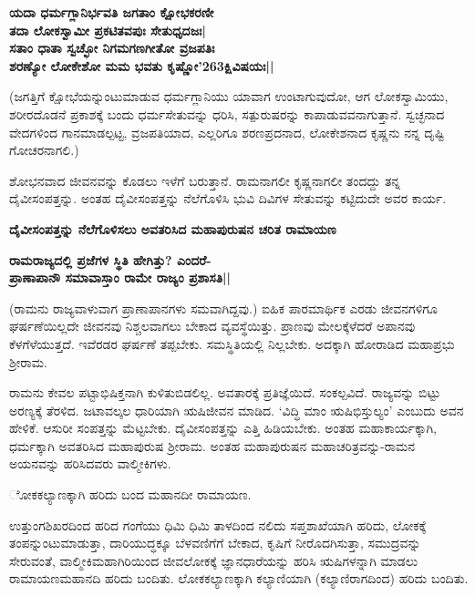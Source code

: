\begin{center} 

{\bf ಯದಾ ಧರ್ಮಗ್ಲಾನಿರ್ಭವತಿ ಜಗತಾಂ ಕ್ಷೋಭಕರಣೀ\\ 

ತದಾ ಲೋಕಸ್ವಾಮೀ ಪ್ರಕಟಿತವಪುಃ ಸೇತುಧೃದಜಃ|\\ 

ಸತಾಂ ಧಾತಾ ಸ್ವಚ್ಛೋ ನಿಗಮಗಣಗೀತೋ ವ್ರಜಪತಿಃ\\ 

ಶರಣ್ಯೋ ಲೋಕೇಶೋ ಮಮ ಭವತು ಕೃಷ್ಣೋ\char'263ಕ್ಷಿವಿಷಯಃ||} 

\end{center} 


(ಜಗತ್ತಿಗೆ ಕ್ಷೋಭೆಯನ್ನುಂಟುಮಾಡುವ ಧರ್ಮಗ್ಲಾನಿಯು ಯಾವಾಗ ಉಂಟಾಗುವುದೋ, ಆಗ ಲೋಕಸ್ವಾಮಿಯು, ಶರೀರದೊಡನೆ ಪ್ರಕಾಶಕ್ಕೆ ಬಂದು ಧರ್ಮಸೇತುವನ್ನು ಧರಿಸಿ, ಸತ್ಪುರುಷರನ್ನು ಕಾಪಾಡುವವನಾಗುತ್ತಾನೆ. ಸ್ವಚ್ಛನಾದ ವೇದಗಳಿಂದ ಗಾನಮಾಡಲ್ಪಟ್ಟ, ವ್ರಜಪತಿಯಾದ, ಎಲ್ಲರಿಗೂ ಶರಣಪ್ರದನಾದ, ಲೋಕೇಶನಾದ ಕೃಷ್ಣನು ನನ್ನ ದೃಷ್ಟಿ ಗೋಚರನಾಗಲಿ.) 


ಶೋಭನವಾದ ಜೀವನವನ್ನು ಕೊಡಲು ಇಳೆಗೆ ಬರುತ್ತಾನೆ. ರಾಮನಾಗಲೀ ಕೃಷ್ಣನಾಗಲೀ ತಂದದ್ದು ತನ್ನ ದೈವೀಸಂಪತ್ತನ್ನು. ಅಂತಹ ದೈವೀಸಂಪತ್ತನ್ನು ನೆಲೆಗೊಳಿಸಿ ಭುವಿ ದಿವಿಗಳ ಸೇತುವನ್ನು ಕಟ್ಟಿದುದೇ ಅವರ ಕಾರ್ಯ. 


{\bf ದೈವೀಸಂಪತ್ತನ್ನು ನೆಲೆಗೊಳಿಸಲು ಅವತರಿಸಿದ ಮಹಾಪುರುಷನ ಚರಿತ ರಾಮಾಯಣ} 


\begin{center} 

{\bf ರಾಮರಾಜ್ಯದಲ್ಲಿ ಪ್ರಜೆಗಳ ಸ್ಥಿತಿ ಹೇಗಿತ್ತು? ಎಂದರೆ-\\ 

ಪ್ರಾಣಾಪಾನೌ ಸಮಾವಾಸ್ತಾಂ ರಾಮೇ ರಾಜ್ಯಂ ಪ್ರಶಾಸತಿ||} 

\end{center} 


(ರಾಮನು ರಾಜ್ಯವಾಳುವಾಗ ಪ್ರಾಣಾಪಾನಗಳು ಸಮವಾಗಿದ್ದವು.) ಐಹಿಕ ಪಾರಮಾರ್ಥಿಕ ಎರಡು ಜೀವನಗಳಿಗೂ ಘರ್ಷಣೆಯಿಲ್ಲದೇ ಜೀವನವು ನಿಶ್ಚಲವಾಗಲು ಬೇಕಾದ ವ್ಯವಸ್ಥೆಯಿತ್ತು. ಪ್ರಾಣವು ಮೇಲಕ್ಕೆಳೆದರೆ ಅಪಾನವು ಕೆಳಗೆಳೆಯುತ್ತದೆ. ಇವೆರಡರ ಘರ್ಷಣೆ ತಪ್ಪಬೇಕು. ಸಮಸ್ಥಿತಿಯಲ್ಲಿ ನಿಲ್ಲಬೇಕು. ಅದಕ್ಕಾಗಿ ಹೋರಾಡಿದ ಮಹಾಪ್ರಭು ಶ್ರೀರಾಮ. 


ರಾಮನು ಕೇವಲ ಪಟ್ಟಾಭಿಷಿಕ್ತನಾಗಿ ಕುಳಿತುಬಿಡಲಿಲ್ಲ. ಅವತಾರಕ್ಕೆ ಪ್ರತಿಜ್ಞೆಯಿದೆ. ಸಂಕಲ್ಪವಿದೆ. ರಾಜ್ಯವನ್ನು ಬಿಟ್ಟು ಅರಣ್ಯಕ್ಕೆ ತೆರಳಿದ. ಜಟಾವಲ್ಕಲ ಧಾರಿಯಾಗಿ ಋಷಿಜೀವನ ಮಾಡಿದ. `ವಿದ್ಧಿ ಮಾಂ ಋಷಿಭಿಸ್ತುಲ್ಯಂ' ಎಂಬುದು ಅವನ ಹೇಳಿಕೆ. ಆಸುರೀ ಸಂಪತ್ತನ್ನು ಮೆಟ್ಟಬೇಕು. ದೈವೀಸಂಪತ್ತನ್ನು ಎತ್ತಿ ಹಿಡಿಯಬೇಕು. ಅಂತಹ ಮಹಾಕಾರ್ಯಕ್ಕಾಗಿ, ಧರ್ಮಕ್ಕಾಗಿ ಅವತರಿಸಿದ ಮಹಾಪುರುಷ ಶ್ರೀರಾಮ. ಅಂತಹ ಮಹಾಪುರುಷನ ಮಹಾಚರಿತ್ರವನ್ನು-ರಾಮನ ಅಯನವನ್ನು ಹರಿಸಿದವರು ವಾಲ್ಮೀಕಿಗಳು. 


\large{ೋಕಕಲ್ಯಾಣಕ್ಕಾಗಿ ಹರಿದು ಬಂದ ಮಹಾನದೀ ರಾಮಾಯಣ.} 


ಉತ್ತುಂಗಶಿಖರದಿಂದ ಹರಿದ ಗಂಗೆಯು ಧಿಮಿ ಧಿಮಿ ತಾಳದಿಂದ ನಲಿದು ಸಪ್ತಶಾಖೆಯಾಗಿ ಹರಿದು, ಲೋಕಕ್ಕೆ ತಂಪನ್ನುಂಟುಮಾಡುತ್ತಾ, ದಾರಿಯುದ್ಧಕ್ಕೂ ಬೆಳವಣಿಗೆಗೆ ಬೇಕಾದ, ಕೃಷಿಗೆ ನೀರೊದಗಿಸುತ್ತಾ, ಸಮುದ್ರವನ್ನು ಸೇರುವಂತೆ, ವಾಲ್ಮೀಕಿಮಹಾಗಿರಿಯಿಂದ ಜೀವಲೋಕಕ್ಕೆ ಜ್ಞಾನಧಾರೆಯನ್ನು ಹರಿಸಿ ಋಷಿಗಳನ್ನಾಗಿ ಮಾಡಲು ರಾಮಾಯಣಮಹಾನದಿ ಹರಿದು ಬಂದಿತು. ಲೋಕಕಲ್ಯಾಣಕ್ಕಾಗಿ ಕಲ್ಯಾಣಿಯಾಗಿ (ಕಲ್ಯಾಣಿರಾಗದಿಂದ) ಹರಿದು ಬಂದಿತು. 


